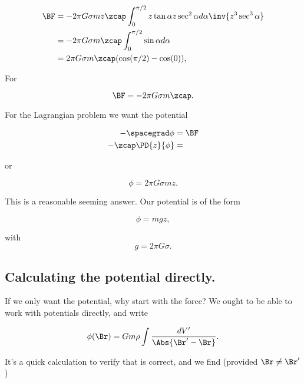 \begin{align*}
\BF
&= - 2 \pi G \sigma m z \zcap \int_0^{\pi/2} z \tan \alpha z \sec^2 \alpha d\alpha \inv{z^3 \sec^3 \alpha } \\
&= - 2 \pi G \sigma m \zcap \int_0^{\pi/2} \sin \alpha d\alpha \\
&= 2 \pi G \sigma m \zcap (\cos(\pi/2) - \cos(0)),
\end{align*}

For

\begin{equation}\label{eqn:classicalMechanicsPs2:30}
\BF = -2 \pi G \sigma m \zcap.
\end{equation}

For the Lagrangian problem we want the potential

\begin{align*}
-\spacegrad \phi &= \BF \\
-\zcap \PD{z}{\phi} &= \\
\end{align*}

or

\begin{equation}\label{eqn:classicalMechanicsPs2:50}
\phi = 2 \pi G \sigma m z.
\end{equation}

This is a reasonable seeming answer.  Our potential is of the form

\begin{equation}\label{eqn:classicalMechanicsPs2:70}
\phi = m g z,
\end{equation}

with
\begin{equation}\label{eqn:classicalMechanicsPs2:90}
g = 2 \pi G \sigma.
\end{equation}

\subsection{Calculating the potential directly.}

If we only want the potential, why start with the force?  We ought to be able to work with potentials directly, and write

\begin{equation}\label{eqn:classicalMechanicsPs2:110}
\phi(\Br) = G m \rho \int \frac{dV'}{\Abs{\Br' - \Br}}.
\end{equation}

It's a quick calculation to verify that is correct, and we find (provided $\Br \ne \Br'$)


